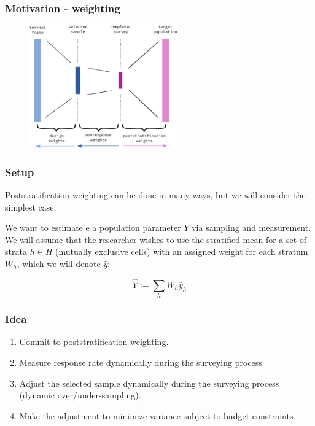 \documentclass[aspectratio=169]{beamer}
\begin{document}
\begin{frame}
\frametitle{Motivation - weighting}

\begin{figure}[H]
\includegraphics[height=200px]{resources/weighting.png}
\end{figure}
\end{frame}


\begin{frame}
\frametitle{Setup}

Poststratification weighting can be done in many ways, but we will consider the simplest case.

We want to estimate e a population parameter $Y$ via sampling and measurement. We will assume that the researcher wishes to use the stratified mean for a set of strata $h \in H$ (mutually exclusive cells) with an assigned weight for each stratum $W_h$, which we will denote $\bar{y}$:


$$
\hat{Y} := \sum_h W_h\bar{y}_h
$$

\end{frame}

\begin{frame}
\frametitle{Idea}


\begin{enumerate}

\item Commit to poststratification weighting.

\item Measure response rate dynamically during the surveying process

\item Adjust the selected sample dynamically during the surveying process (dynamic over/under-sampling).

\item Make the adjustment to minimize variance subject to budget constraints.


\end{enumerate}



\end{frame}
\end{document}
